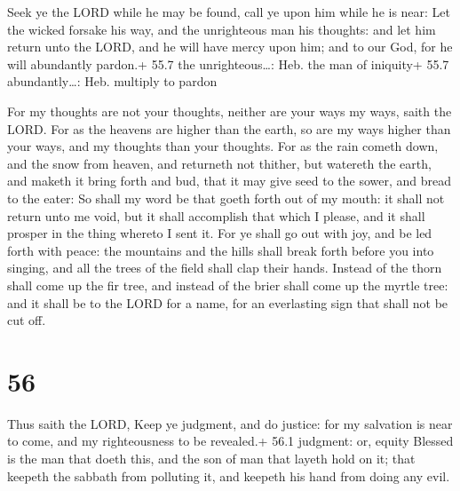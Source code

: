  Seek ye the LORD while he may be found, call ye upon him
while he is near:  Let the wicked forsake his way, and the
unrighteous man his thoughts: and let him return unto the LORD, and he
will have mercy upon him; and to our God, for he will abundantly
pardon.+ 55.7 the unrighteous\ldots: Heb. the man of iniquity+ 55.7
abundantly\ldots: Heb. multiply to pardon

 For my thoughts are not your thoughts, neither are your
ways my ways, saith the LORD.  For as the heavens are higher
than the earth, so are my ways higher than your ways, and my thoughts
than your thoughts.  For as the rain cometh down, and the
snow from heaven, and returneth not thither, but watereth the earth, and
maketh it bring forth and bud, that it may give seed to the sower, and
bread to the eater:  So shall my word be that goeth forth
out of my mouth: it shall not return unto me void, but it shall
accomplish that which I please, and it shall prosper in the thing
whereto I sent it.  For ye shall go out with joy, and be
led forth with peace: the mountains and the hills shall break forth
before you into singing, and all the trees of the field shall clap their
hands.  Instead of the thorn shall come up the fir tree,
and instead of the brier shall come up the myrtle tree: and it shall be
to the LORD for a name, for an everlasting sign that shall not be cut
off.

\hypertarget{section-55}{%
\section{56}\label{section-55}}

 Thus saith the LORD, Keep ye judgment, and do justice: for
my salvation is near to come, and my righteousness to be revealed.+ 56.1
judgment: or, equity  Blessed is the man that doeth this,
and the son of man that layeth hold on it; that keepeth the sabbath from
polluting it, and keepeth his hand from doing any evil.

